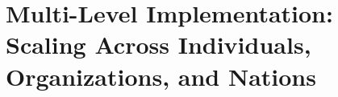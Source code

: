 %
%
%
%
%
%
%
%

\chapter{Multi-Level Implementation: Scaling Across Individuals, Organizations, and Nations}
\label{ch:multi-level-implementation}

